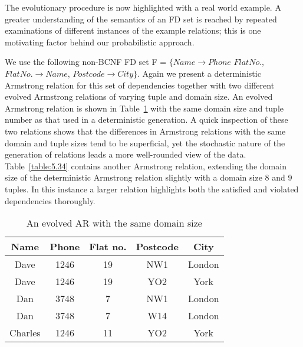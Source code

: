 The evolutionary procedure is now highlighted with a real world 
example. A greater understanding of the semantics of 
an FD set
is reached by repeated examinations of different instances of the
example relations; this is one motivating factor behind our probabilistic approach.
\begin{example}
\begin{rm}
We use the following non-BCNF FD set F =
$\{ Name \to Phone$ $Flat No.$, $Flat No. \to Name$, $Postcode \to City \}$.
Again we present a deterministic Armstrong relation for this set of 
dependencies together with two different evolved Armstrong relations
of varying tuple and domain size. An evolved
Armstrong relation is shown in Table~\ref{table:5.32} with the same
domain size and tuple number as that used in a deterministic
generation. A quick 
inspection of these two relations shows that the differences in 
Armstrong relations with the same domain and tuple sizes tend to be
superficial, yet the stochastic nature of the generation of relations leads
 a more well-rounded view of the data. Table~\ref{table:5.34} contains another Armstrong relation, 
extending the domain size of the deterministic Armstrong relation
slightly with a domain size 8 and 9 tuples. In
this instance a larger relation highlights both the satisfied
and violated dependencies thoroughly. 
\end{rm}
\end{example}

{\line
\begin{table}
\begin{center}
\begin{tabular}{|c|c|c|c|c|} \hline 
{ \bf Name} & { \bf Phone} & {\bf Flat no. }  & { \bf Postcode}  & {\bf City} \\ \hline
Dave & 1246 & 19 & NW1 & London  \\
Dave & 1246 & 19 & YO2 & York \\
Dan & 3748 & 7 & NW1 & London \\
Dan & 3748 & 7 & W14 & London \\
Charles & 1246 & 11 & YO2 & York \\ \hline
\end{tabular}
\end{center}
\caption{\label{table:5.32} An evolved AR with the same domain size }
\end{table}
}

